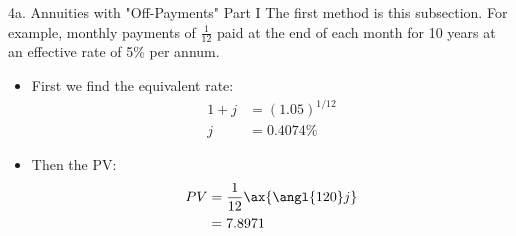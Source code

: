 \begin{CHPT_SUMM_AUTO}[label = {L.-4a}]{4a. Annuities with "Off-Payments" Part I}
The first method is this subsection. For example, monthly payments of $\frac{1}{12}$ paid at the end of each month for 10 years at an effective rate of 5\% per annum. 
\begin{itemize}[leftmargin = *]
	\item	First we find the equivalent rate:
				\begin{align*}
				1 + j	&= (1.05)^{1/12}	\\
					j	&=	0.4074\%
				\end{align*}
	\item	Then the PV:
				\begin{align*}
				PV	&=	\frac{1}{12} \ax{\angl{120}j}	\\
					&=	7.8971
				\end{align*}
\end{itemize}
\end{CHPT_SUMM_AUTO}

